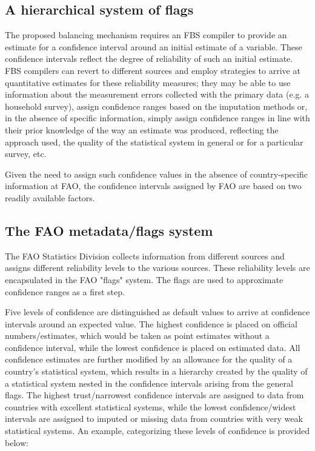 \documentclass[nojss]{jss}
\begin{document}
\subsection{A hierarchical system of flags}
The proposed balancing mechanism requires an FBS compiler to provide an estimate for a confidence interval around an initial estimate of a variable. These confidence intervals reflect the degree of reliability of such an initial estimate. FBS compilers can revert to different sources and employ strategies to arrive at quantitative estimates for these reliability measures; they may be able to use information about the measurement errors collected with the primary data (e.g. a household survey), assign confidence ranges based on the imputation methods or, in the absence of specific information, simply assign confidence ranges in line with their prior knowledge of the way an estimate was produced, reflecting the approach used, the quality of the statistical system in general or for a particular survey, etc.  

Given the need to assign such confidence values in the absence of country-specific information at FAO, the confidence intervals assigned by FAO are based on two readily available factors. 

\subsection{The FAO metadata/flags system}
The FAO Statistics Division collects information from different sources and assigns different reliability levels to the various sources. These reliability levels are encapsulated in the FAO "flags" system. The flags are used to approximate confidence ranges as a first step.

Five levels of confidence are distinguished as default values to arrive at confidence intervals around an expected value. The highest confidence is placed on official numbers/estimates, which would be taken as point estimates without a confidence interval, while the lowest confidence is placed on estimated data. All confidence estimates are further modified by an allowance for the quality of a country's statistical system, which results in a hierarchy created by the quality of a statistical system nested in the confidence intervals arising from the general flags. The highest trust/narrowest confidence intervals are assigned to data from countries with excellent statistical systems, while the lowest confidence/widest intervals are assigned to imputed or missing data from countries with very weak statistical systems. An example, categorizing these levels of confidence is provided below:
\end{document}
